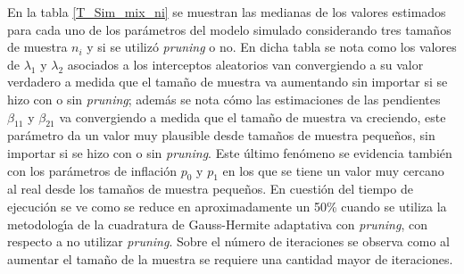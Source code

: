 En la tabla \ref{T_Sim_mix_ni} se muestran las medianas de los valores estimados para cada uno de los par\'{a}metros del modelo simulado considerando tres tama\~{n}os de muestra $n_i$ y si se utiliz\'{o} \textit{pruning} o no. En dicha tabla se nota como los valores de $\lambda_1$ y $\lambda_2$ asociados a los interceptos aleatorios van convergiendo a su valor verdadero a medida que el tama\~{n}o de muestra va aumentando sin importar si se hizo con o sin \textit{pruning}; adem\'{a}s se nota c\'{o}mo las estimaciones de las pendientes $\beta_{11}$ y $\beta_{21}$ va convergiendo a medida que el tama\~{n}o de muestra va creciendo, este par\'{a}metro da un valor muy plausible desde tama\~{n}os de muestra peque\~{n}os, sin importar si se hizo con o sin \textit{pruning}. Este \'{u}ltimo fen\'{o}meno se evidencia tambi\'{e}n con los par\'{a}metros de inflaci\'{o}n $p_0$ y $p_1$ en los que se tiene un valor muy cercano al real desde los tama\~{n}os de muestra peque\~{n}os. En cuesti\'{o}n del tiempo de ejecuci\'{o}n se ve como se reduce en aproximadamente un 50\% cuando se utiliza la metodolog\'{\i}a de la cuadratura de Gauss-Hermite adaptativa con \textit{pruning}, con respecto a no utilizar \textit{pruning}. Sobre el n\'{u}mero de iteraciones se observa como al aumentar el tama\~{n}o de la muestra se requiere una cantidad mayor de iteraciones.\\

